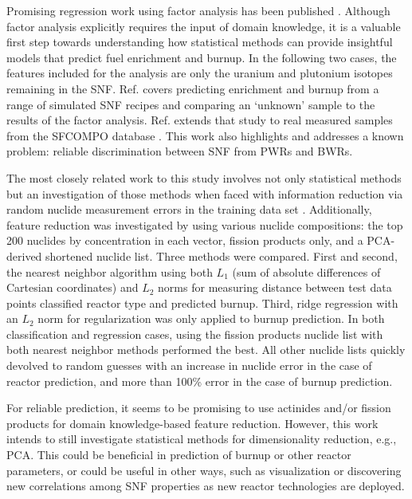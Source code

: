 Promising regression work using factor analysis has been published
\cite{nicolaou_2006, nicolaou_2014}.  Although factor analysis explicitly
requires the input of domain knowledge, it is a valuable first step towards
understanding how statistical methods can provide insightful models that
predict fuel enrichment and burnup. In the following two cases, the features
included for the analysis are only the uranium and plutonium isotopes remaining
in the \gls{SNF}.  Ref. \cite{nicolaou_2006} covers predicting enrichment and
burnup from a range of simulated \gls{SNF} recipes and comparing an `unknown'
sample to the results of the factor analysis. Ref.  \cite{nicolaou_2014}
extends that study to real measured samples from the \gls{SFCOMPO} database
\cite{sfcompo}. This work also highlights and addresses a known problem:
reliable discrimination between \gls{SNF} from \gls{PWR}s and \gls{BWR}s. 

The most closely related work to this study involves not only statistical
methods but an investigation of those methods when faced with information
reduction via random nuclide measurement errors in the training data set
\cite{dayman_feasibility_2013}.  Additionally, feature reduction was
investigated by using various nuclide compositions: the top 200 nuclides by
concentration in each vector, fission products only, and a \gls{PCA}-derived
shortened nuclide list.  Three methods were compared. First and second, the
nearest neighbor algorithm using both $L_1$ (sum of absolute differences of
Cartesian coordinates) and $L_2$ norms for measuring distance between test data
points classified reactor type and predicted burnup.  Third, ridge regression
with an $L_2$ norm for regularization was only applied to burnup prediction. In
both classification and regression cases, using the fission products nuclide
list with both nearest neighbor methods performed the best. All other nuclide
lists quickly devolved to random guesses with an increase in nuclide error in
the case of reactor prediction, and more than 100\% error in the case of burnup
prediction.

For reliable prediction, it seems to be promising to use actinides
\cite{nicolaou_2006, nicolaou_2014} and/or fission products
\cite{dayman_feasibility_2013} for domain knowledge-based feature reduction.
However, this work intends to still investigate statistical methods for
dimensionality reduction, e.g., \gls{PCA}. This could be beneficial in
prediction of burnup or other reactor parameters, or could be useful in other
ways, such as visualization or discovering new correlations among \gls{SNF}
properties as new reactor technologies are deployed.

